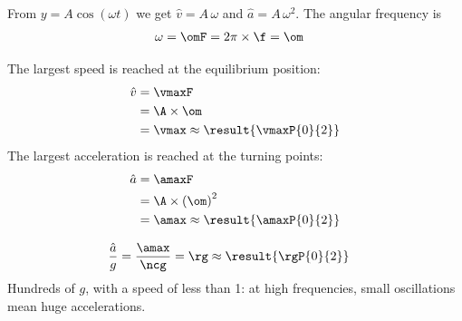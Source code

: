 From $y = A\cos(\omega t)$ we get $\hat v = A\,\omega$ and $\hat a = A\,\omega^2$. The angular frequency is
\begin{align}
 \omega &= \omF = 2\pi\times\f = \om
\end{align}

\begin{abcliste}
\abc
The largest speed is reached at the equilibrium position:
\begin{align}
 \hat v &= \vmaxF \\
   &= \A\times\om \\
   &= \vmax \approx \result{\vmaxP{0}{2}}
\end{align}
The largest acceleration is reached at the turning points:
\begin{align}
 \hat a &= \amaxF \\
   &= \A\times\left(\om\right)^2 \\
   &= \amax \approx \result{\amaxP{0}{2}}
\end{align}

\abc
\begin{align}
 \frac{\hat a}{g} &= \frac{\amax}{\ncg} = \rg \approx \result{\rgP{0}{2}}
\end{align}
Hundreds of $g$, with a speed of less than \SI{1}{\mps}: at high frequencies, small oscillations mean huge accelerations.
\end{abcliste}
